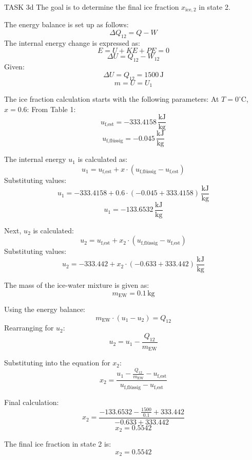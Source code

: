 TASK 3d  
The goal is to determine the final ice fraction \( x_{\text{ice},2} \) in state 2.  

The energy balance is set up as follows:  
\[
\Delta Q_{12} = Q - W
\]  
The internal energy change is expressed as:  
\[
E = U + KE + PE = 0
\]  
\[
\Delta U = Q_{12} - W_{12}
\]  
Given:  
\[
\Delta U = Q_{12} = 1500 \, \text{J}
\]  
\[
m = U = U_1
\]  

The ice fraction calculation starts with the following parameters:  
At \( T = 0^\circ \text{C} \), \( x = 0.6 \):  
From Table 1:  
\[
u_{\text{f,est}} = -333.4158 \, \frac{\text{kJ}}{\text{kg}}
\]  
\[
u_{\text{f,flüssig}} = -0.045 \, \frac{\text{kJ}}{\text{kg}}
\]  

The internal energy \( u_1 \) is calculated as:  
\[
u_1 = u_{\text{f,est}} + x \cdot (u_{\text{f,flüssig}} - u_{\text{f,est}})
\]  
Substituting values:  
\[
u_1 = -333.4158 + 0.6 \cdot (-0.045 + 333.4158) \, \frac{\text{kJ}}{\text{kg}}
\]  
\[
u_1 = -133.6532 \, \frac{\text{kJ}}{\text{kg}}
\]  

Next, \( u_2 \) is calculated:  
\[
u_2 = u_{\text{f,est}} + x_2 \cdot (u_{\text{f,flüssig}} - u_{\text{f,est}})
\]  
Substituting values:  
\[
u_2 = -333.442 + x_2 \cdot (-0.633 + 333.442) \, \frac{\text{kJ}}{\text{kg}}
\]  

The mass of the ice-water mixture is given as:  
\[
m_{\text{EW}} = 0.1 \, \text{kg}
\]  

Using the energy balance:  
\[
m_{\text{EW}} \cdot (u_1 - u_2) = Q_{12}
\]  
Rearranging for \( u_2 \):  
\[
u_2 = u_1 - \frac{Q_{12}}{m_{\text{EW}}}
\]  

Substituting into the equation for \( x_2 \):  
\[
x_2 = \frac{u_1 - \frac{Q_{12}}{m_{\text{EW}}} - u_{\text{f,est}}}{u_{\text{f,flüssig}} - u_{\text{f,est}}}
\]  

Final calculation:  
\[
x_2 = \frac{-133.6532 - \frac{1500}{0.1} + 333.442}{-0.633 + 333.442}
\]  
\[
x_2 = 0.5542
\]  

The final ice fraction in state 2 is:  
\[
x_2 = 0.5542
\]